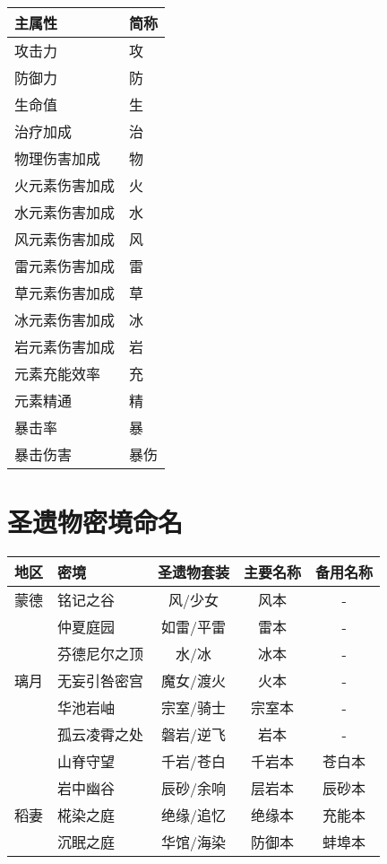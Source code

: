 \begin{longtabu} {|X[c]|X[c]|}
	\hline
	{主属性}         & {简称} \\
	\hline
	\endhead
	\hline
	\endfoot
	{攻击力}         & {攻}   \\
	{防御力}         & {防}   \\
	{生命值}         & {生}   \\
	{治疗加成}         & {治}   \\
	{物理伤害加成}   & {物}   \\
	{火元素伤害加成} & {火}   \\
	{水元素伤害加成} & {水}   \\
	{风元素伤害加成} & {风}   \\
	{雷元素伤害加成} & {雷}   \\
	{草元素伤害加成} & {草}   \\
	{冰元素伤害加成} & {冰}   \\
	{岩元素伤害加成} & {岩}   \\
	\hline
	{元素充能效率}   & {充}   \\
	{元素精通}       & {精}   \\
	\hline
	{暴击率}         & {暴}   \\
	{暴击伤害}       & {暴伤} \\
\end{longtabu}




\section{圣遗物密境命名}

\noindent\begin{tabu}{|c|X[c]|c|c|c|}
	\hline
	{地区} & {密境}         & {圣遗物套装} & {主要名称} & {备用名称} \\
	\hline
	{蒙德} & {铭记之谷}     & {风/少女}    & {风本}     & {-}        \\
	{ }    & {仲夏庭园}     & {如雷/平雷}  & {雷本}     & {-}        \\
	{ }    & {芬德尼尔之顶} & {水/冰}      & {冰本}     & {-}        \\
	\hline
	{璃月} & {无妄引咎密宫} & {魔女/渡火}  & {火本}     & {-}        \\
	{ }    & {华池岩岫}     & {宗室/骑士}  & {宗室本}   & {-}        \\
	{ }    & {孤云凌霄之处} & {磐岩/逆飞}  & {岩本}     & {-}        \\
	{ }    & {山脊守望}     & {千岩/苍白}  & {千岩本}   & {苍白本}   \\
	{ }    & {岩中幽谷}     & {辰砂/余响}  & {层岩本}   & {辰砂本}   \\
	\hline
	{稻妻} & {椛染之庭}     & {绝缘/追忆}  & {绝缘本}   & {充能本}   \\
	{ }    & {沉眠之庭}     & {华馆/海染}  & {防御本}   & {蚌埠本}   \\
	\hline
\end{tabu}






